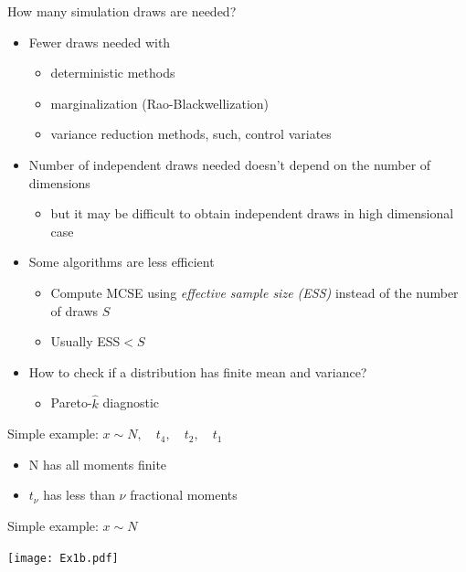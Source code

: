 \documentclass[english,t]{beamer}
\begin{document}
\begin{frame}{How many simulation draws are needed?}

  \begin{itemize}
  \item Fewer draws needed with
    \begin{itemize}
    \item deterministic methods
    \item marginalization (Rao-Blackwellization)
    \item variance reduction methods, such, control variates
    \end{itemize}
  \item<2-> Number of independent draws needed doesn't depend on the
    number of dimensions
    \begin{itemize}
    \item but it may be difficult to obtain independent draws in high
      dimensional case
    \end{itemize}
  \item<3-> Some algorithms are less efficient
    \begin{itemize}
    \item Compute MCSE using \textit{effective sample size (ESS)}
      instead of the number of draws $S$
    \item Usually ESS$<S$
    \end{itemize}
  \item<4-> How to check if a distribution has finite mean and variance?
    \begin{itemize}
    \item Pareto-$\hat{k}$ diagnostic
    \end{itemize}
  \end{itemize}

\end{frame}

\begin{frame}{Simple example: $x \sim N, \quad t_4, \quad t_2, \quad t_1$}

  \begin{itemize}
  \item N has all moments finite
  \item $t_\nu$ has less than $\nu$ fractional moments
  \end{itemize}
\end{frame}

\begin{frame}{Simple example: $x \sim N$}

    \vspace{-1\baselineskip}
    \texttt{[image: Ex1b.pdf]}\\
\end{frame}
\end{document}
